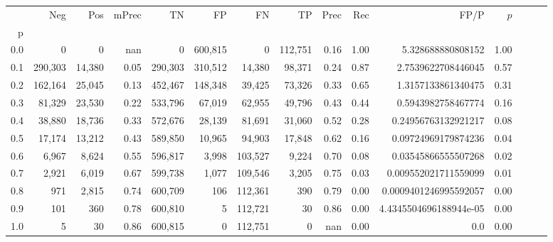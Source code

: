 \begin{tabular}{rrrrrrrrrrrrrrr}
\toprule
{} &      Neg &     Pos & mPrec &       TN &       FP &       FN &       TP &  Prec &   Rec &                    FP/P & $\hat{p}$ \\
p   &          &         &       &          &          &          &          &       &       &                         &           \\
\midrule
0.0 &        0 &       0 &   nan &        0 &  600,815 &        0 &  112,751 &  0.16 &  1.00 &       5.328688880808152 &      1.00 \\
0.1 &  290,303 &  14,380 &  0.05 &  290,303 &  310,512 &   14,380 &   98,371 &  0.24 &  0.87 &      2.7539622708446045 &      0.57 \\
0.2 &  162,164 &  25,045 &  0.13 &  452,467 &  148,348 &   39,425 &   73,326 &  0.33 &  0.65 &      1.3157133861340475 &      0.31 \\
0.3 &   81,329 &  23,530 &  0.22 &  533,796 &   67,019 &   62,955 &   49,796 &  0.43 &  0.44 &      0.5943982758467774 &      0.16 \\
0.4 &   38,880 &  18,736 &  0.33 &  572,676 &   28,139 &   81,691 &   31,060 &  0.52 &  0.28 &     0.24956763132921217 &      0.08 \\
0.5 &   17,174 &  13,212 &  0.43 &  589,850 &   10,965 &   94,903 &   17,848 &  0.62 &  0.16 &     0.09724969179874236 &      0.04 \\
0.6 &    6,967 &   8,624 &  0.55 &  596,817 &    3,998 &  103,527 &    9,224 &  0.70 &  0.08 &     0.03545866555507268 &      0.02 \\
0.7 &    2,921 &   6,019 &  0.67 &  599,738 &    1,077 &  109,546 &    3,205 &  0.75 &  0.03 &    0.009552021711559099 &      0.01 \\
0.8 &      971 &   2,815 &  0.74 &  600,709 &      106 &  112,361 &      390 &  0.79 &  0.00 &   0.0009401246995592057 &      0.00 \\
0.9 &      101 &     360 &  0.78 &  600,810 &        5 &  112,721 &       30 &  0.86 &  0.00 &  4.4345504696188944e-05 &      0.00 \\
1.0 &        5 &      30 &  0.86 &  600,815 &        0 &  112,751 &        0 &   nan &  0.00 &                     0.0 &      0.00 \\
\bottomrule
\end{tabular}

